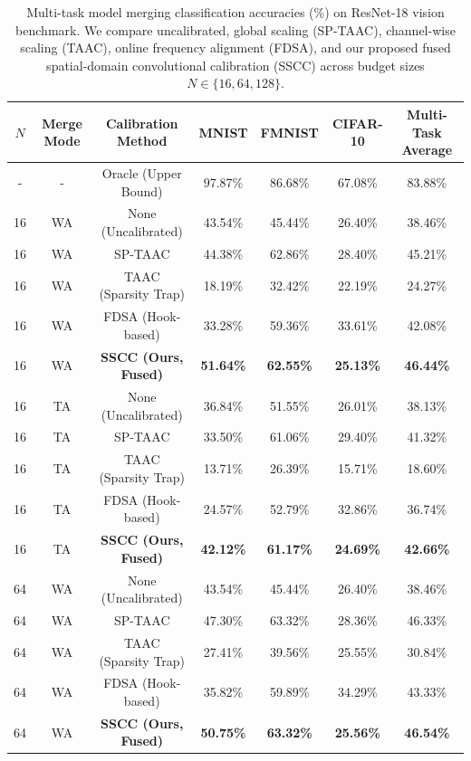 \documentclass{article}
\theoremstyle{plain}
\theoremstyle{definition}
\theoremstyle{remark}
\begin{document}
\begin{table}[t]
\caption{Multi-task model merging classification accuracies (\%) on ResNet-18 vision benchmark. We compare uncalibrated, global scaling (SP-TAAC), channel-wise scaling (TAAC), online frequency alignment (FDSA), and our proposed fused spatial-domain convolutional calibration (SSCC) across budget sizes $N \in \{16, 64, 128\}$.}
\label{tab:main_results}
\vskip 0.05in
\begin{center}
\begin{small}
\begin{tabular}{ccccccc}
\toprule
$N$ & Merge Mode & Calibration Method & MNIST & FMNIST & CIFAR-10 & Multi-Task Average \\
\midrule
- & - & Oracle (Upper Bound) & 97.87\% & 86.68\% & 67.08\% & 83.88\% \\
\midrule
16 & WA & None (Uncalibrated) & 43.54\% & 45.44\% & 26.40\% & 38.46\% \\
16 & WA & SP-TAAC & 44.38\% & 62.86\% & 28.40\% & 45.21\% \\
16 & WA & TAAC (Sparsity Trap) & 18.19\% & 32.42\% & 22.19\% & 24.27\% \\
16 & WA & FDSA (Hook-based) & 33.28\% & 59.36\% & 33.61\% & 42.08\% \\
16 & WA & \textbf{SSCC (Ours, Fused)} & \textbf{51.64\%} & \textbf{62.55\%} & \textbf{25.13\%} & \textbf{46.44\%} \\
\midrule
16 & TA & None (Uncalibrated) & 36.84\% & 51.55\% & 26.01\% & 38.13\% \\
16 & TA & SP-TAAC & 33.50\% & 61.06\% & 29.40\% & 41.32\% \\
16 & TA & TAAC (Sparsity Trap) & 13.71\% & 26.39\% & 15.71\% & 18.60\% \\
16 & TA & FDSA (Hook-based) & 24.57\% & 52.79\% & 32.86\% & 36.74\% \\
16 & TA & \textbf{SSCC (Ours, Fused)} & \textbf{42.12\%} & \textbf{61.17\%} & \textbf{24.69\%} & \textbf{42.66\%} \\
\midrule
64 & WA & None (Uncalibrated) & 43.54\% & 45.44\% & 26.40\% & 38.46\% \\
64 & WA & SP-TAAC & 47.30\% & 63.32\% & 28.36\% & 46.33\% \\
64 & WA & TAAC (Sparsity Trap) & 27.41\% & 39.56\% & 25.55\% & 30.84\% \\
64 & WA & FDSA (Hook-based) & 35.82\% & 59.89\% & 34.29\% & 43.33\% \\
64 & WA & \textbf{SSCC (Ours, Fused)} & \textbf{50.75\%} & \textbf{63.32\%} & \textbf{25.56\%} & \textbf{46.54\%} \\

\end{tabular}
\end{small}
\end{center}
\end{table}
\end{document}
